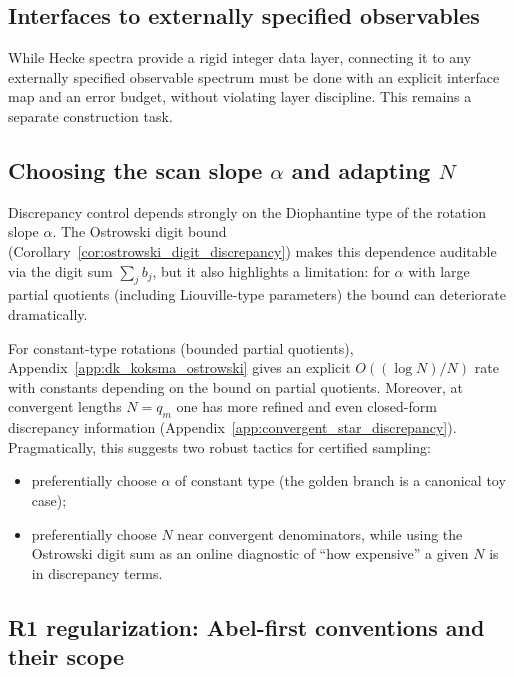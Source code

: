 \subsection{Interfaces to externally specified observables}

While Hecke spectra provide a rigid integer data layer, connecting it to any externally specified observable spectrum must be done with an explicit interface map and an error budget, without violating layer discipline. This remains a separate construction task.

\subsection{Choosing the scan slope \texorpdfstring{$\alpha$}{alpha} and adapting \texorpdfstring{$N$}{N}}
\label{app:limitations_alpha_N}

Discrepancy control depends strongly on the Diophantine type of the rotation slope $\alpha$.
The Ostrowski digit bound (Corollary~\ref{cor:ostrowski_digit_discrepancy}) makes this dependence auditable via the digit sum $\sum_j b_j$, but it also highlights a limitation: for $\alpha$ with large partial quotients (including Liouville-type parameters) the bound can deteriorate dramatically.
\par
For constant-type rotations (bounded partial quotients), Appendix~\ref{app:dk_koksma_ostrowski} gives an explicit $O((\log N)/N)$ rate with constants depending on the bound on partial quotients.
Moreover, at convergent lengths $N=q_m$ one has more refined and even closed-form discrepancy information (Appendix~\ref{app:convergent_star_discrepancy}).
Pragmatically, this suggests two robust tactics for certified sampling:
\begin{itemize}
\item preferentially choose $\alpha$ of constant type (the golden branch is a canonical toy case);
\item preferentially choose $N$ near convergent denominators, while using the Ostrowski digit sum as an online diagnostic of ``how expensive'' a given $N$ is in discrepancy terms.
\end{itemize}

\subsection{R1 regularization: Abel-first conventions and their scope}
\label{app:limitations_R1_scope}


